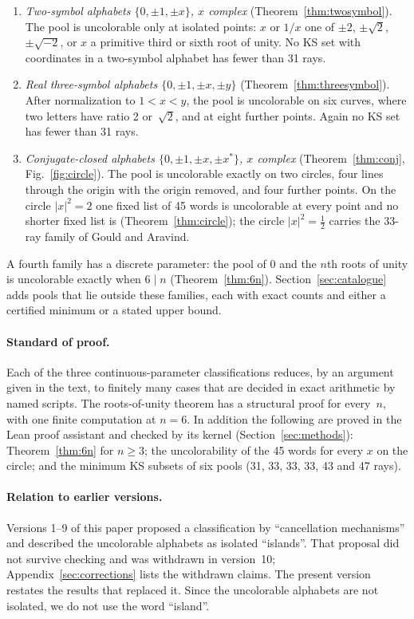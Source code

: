 \begin{enumerate}[label=(\roman*)]
\item \emph{Two-symbol alphabets $\{0,\pm1,\pm x\}$, $x$ complex} (Theorem~\ref{thm:twosymbol}).
The pool is uncolorable only at isolated points: $x$ or $1/x$ one of $\pm2$, $\pm\sqrt2$,
$\pm\sqrt{-2}$, or $x$ a primitive third or sixth root of unity.  No KS set with coordinates in
a two-symbol alphabet has fewer than 31 rays.
\item \emph{Real three-symbol alphabets $\{0,\pm1,\pm x,\pm y\}$} (Theorem~\ref{thm:threesymbol}).
After normalization to $1<x<y$, the pool is uncolorable on six curves, where two letters have
ratio 2 or~$\sqrt2$, and at eight further points.  Again no KS set has fewer than 31 rays.
\item \emph{Conjugate-closed alphabets $\{0,\pm1,\pm x,\pm x^{*}\}$, $x$ complex}
(Theorem~\ref{thm:conj}, Fig.~\ref{fig:circle}).  The pool is uncolorable exactly on two
circles, four lines through the origin with the origin removed, and four further points.  On
the circle $|x|^2=2$ one fixed list of 45 words is uncolorable at every point and no shorter
fixed list is
(Theorem~\ref{thm:circle}); the circle $|x|^2=\tfrac12$ carries the 33-ray family of Gould and
Aravind.
\end{enumerate}

A fourth family has a discrete parameter: the pool of $0$ and the $n$th roots of unity is
uncolorable exactly when $6\mid n$ (Theorem~\ref{thm:6n}).  Section~\ref{sec:catalogue} adds
pools that lie outside these families, each with exact counts and either a certified minimum or
a stated upper bound.

\paragraph{Standard of proof.}
Each of the three continuous-parameter classifications reduces, by an argument given in the
text, to finitely many cases that are decided in exact arithmetic by named scripts.  The
roots-of-unity theorem has a structural proof for every~$n$, with one finite computation at
$n=6$.  In addition the following are proved in the Lean
proof assistant and checked by its kernel (Section~\ref{sec:methods}): Theorem~\ref{thm:6n} for
$n\ge3$; the uncolorability of the 45 words for every $x$ on the circle; and the minimum KS
subsets of six pools (31, 33, 33, 33, 43 and 47 rays).

\paragraph{Relation to earlier versions.}
Versions 1--9 of this paper proposed a classification by ``cancellation mechanisms'' and
described the uncolorable alphabets as isolated ``islands''.  That proposal did not survive
checking and was withdrawn in version~10; Appendix~\ref{sec:corrections} lists the withdrawn
claims.  The present version restates the results that replaced it.  Since the uncolorable
alphabets are not isolated, we do not use the word ``island''.


